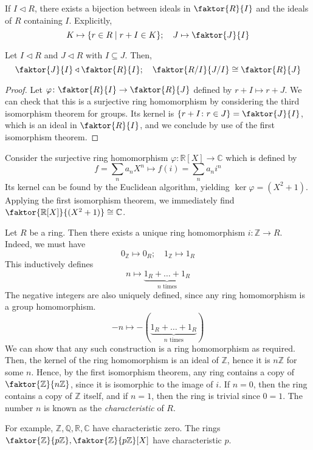 \begin{remark}
	If \( I \triangleleft R \), there exists a bijection between ideals in \( \faktor{R}{I} \) and the ideals of \( R \) containing \( I \).
	Explicitly,
	\[ K \mapsto \qty{r \in R \mid r + I \in K};\quad J \mapsto \faktor{J}{I} \]
\end{remark}
\begin{theorem}
	Let \( I \triangleleft R \) and \( J \triangleleft R \) with \( I \subseteq J \).
	Then,
	\[ \faktor{J}{I} \triangleleft \faktor{R}{I};\quad \faktor{R/I}{J/I} \cong \faktor{R}{J} \]
\end{theorem}
\begin{proof}
	Let \( \varphi \colon \faktor{R}{I} \to \faktor{R}{J} \) defined by \( r+I \mapsto r+J \).
	We can check that this is a surjective ring homomorphism by considering the third isomorphism theorem for groups.
	Its kernel is \( \qty{r + I \colon r \in J} = \faktor{J}{I} \), which is an ideal in \( \faktor{R}{I} \), and we conclude by use of the first isomorphism theorem.
\end{proof}
\begin{example}
	Consider the surjective ring homomorphism \( \varphi \colon \mathbb R[X] \to \mathbb C \) which is defined by
	\[ f = \sum_n a_n X^n \mapsto f(i) = \sum_n a_n i^n \]
	Its kernel can be found by the Euclidean algorithm, yielding \( \ker \varphi = (X^2 + 1) \).
	Applying the first isomorphism theorem, we immediately find \( \faktor{\mathbb R[X]}{(X^2 + 1)} \cong \mathbb C \).
\end{example}
\begin{example}
	Let \( R \) be a ring.
	Then there exists a unique ring homomorphism \( i \colon \mathbb Z \to R \).
	Indeed, we must have
	\[ 0_{\mathbb Z} \mapsto 0_R;\quad 1_{\mathbb Z} \mapsto 1_R \]
	This inductively defines
	\[ n \mapsto \underbrace{1_R + \dots + 1_R}_{n \text{ times}} \]
	The negative integers are also uniquely defined, since any ring homomorphism is a group homomorphism.
	\[ -n \mapsto -(\underbrace{1_R + \dots + 1_R}_{n \text{ times}}) \]
	We can show that any such construction is a ring homomorphism as required.
	Then, the kernel of the ring homomorphism is an ideal of \( \mathbb Z \), hence it is \( n\mathbb Z \) for some \( n \).
	Hence, by the first isomorphism theorem, any ring contains a copy of \( \faktor{\mathbb Z}{n\mathbb Z} \), since it is isomorphic to the image of \( i \).
	If \( n = 0 \), then the ring contains a copy of \( \mathbb Z \) itself, and if \( n = 1 \), then the ring is trivial since \( 0 = 1 \).
	The number \( n \) is known as the \textit{characteristic} of \( R \).

	For example, \( \mathbb Z, \mathbb Q, \mathbb R, \mathbb C \) have characteristic zero.
	The rings \( \faktor{\mathbb Z}{p \mathbb Z}, \faktor{\mathbb Z}{p \mathbb Z}[X] \) have characteristic \( p \).
\end{example}

